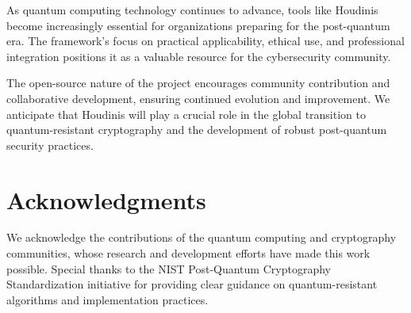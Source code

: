 \documentclass[11pt]{article}
\begin{document}
As quantum computing technology continues to advance, tools like Houdinis become increasingly essential for organizations preparing for the post-quantum era. The framework's focus on practical applicability, ethical use, and professional integration positions it as a valuable resource for the cybersecurity community.

The open-source nature of the project encourages community contribution and collaborative development, ensuring continued evolution and improvement. We anticipate that Houdinis will play a crucial role in the global transition to quantum-resistant cryptography and the development of robust post-quantum security practices.

\section{Acknowledgments}

We acknowledge the contributions of the quantum computing and cryptography communities, whose research and development efforts have made this work possible. Special thanks to the NIST Post-Quantum Cryptography Standardization initiative for providing clear guidance on quantum-resistant algorithms and implementation practices.
\end{document}
